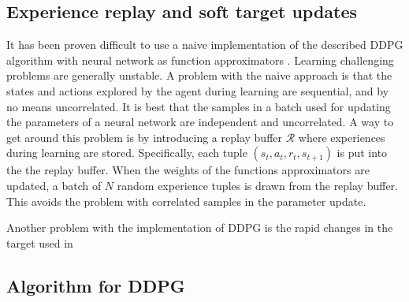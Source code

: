 \documentclass[class=book, crop=false]{standalone}
\begin{document}
\subsection{Experience replay and soft target updates}
It has been proven difficult to use a naive implementation of the described DDPG algorithm with neural network as function approximators \cite{DBLP:journals/corr/LillicrapHPHETS15}. Learning challenging problems are generally unstable. A problem with the naive approach is that the states and actions explored by the agent during learning are sequential, and by no means uncorrelated. It is best that the samples in a batch used for updating the parameters of a neural network are independent and uncorrelated. A way to get around this problem is by introducing a replay buffer $\mathcal{R}$ where experiences during learning are stored. Specifically, each tuple $(s_{t},a_{t},r_{t},s_{t+1})$ is put into the the replay buffer. When the weights of the functions approximators are updated, a batch of $N$ random experience tuples is drawn from the replay buffer. This avoids the problem with correlated samples in the parameter update.

Another problem with the implementation of DDPG is the rapid changes in the target used in 



\subsection{Algorithm for DDPG}
\end{document}
